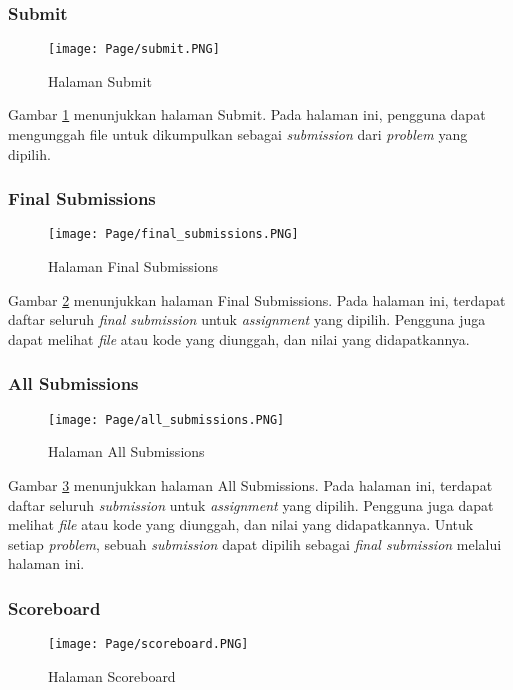 \subsubsection{Submit}
    \begin{figure}[H]
    	\centering  
    	\texttt{[image: Page/submit.PNG]}  
    	\caption{Halaman Submit}
    	\label{fig:3:submit} 
    \end{figure} 
    
    Gambar \ref{fig:3:submit} menunjukkan halaman Submit. Pada halaman ini, pengguna dapat mengunggah file untuk dikumpulkan sebagai \textit{submission} dari \textit{problem} yang dipilih.

\subsubsection{Final Submissions}
    \begin{figure}[H]
    	\centering  
    	\texttt{[image: Page/final\_submissions.PNG]}  
    	\caption{Halaman Final Submissions}
    	\label{fig:3:final_submissions} 
    \end{figure} 
    
    Gambar \ref{fig:3:final_submissions} menunjukkan halaman Final Submissions. Pada halaman ini, terdapat daftar seluruh \textit{final submission} untuk \textit{assignment} yang dipilih. Pengguna juga dapat melihat \textit{file} atau kode yang diunggah, dan nilai yang didapatkannya.
    
\subsubsection{All Submissions}
    \begin{figure}[H]
    	\centering  
    	\texttt{[image: Page/all\_submissions.PNG]}  
    	\caption{Halaman All Submissions}
    	\label{fig:3:all_submissions} 
    \end{figure} 
    
    Gambar \ref{fig:3:all_submissions} menunjukkan halaman All Submissions. Pada halaman ini, terdapat daftar seluruh \textit{submission} untuk \textit{assignment} yang dipilih. Pengguna juga dapat melihat \textit{file} atau kode yang diunggah, dan nilai yang didapatkannya. Untuk setiap \textit{problem}, sebuah \textit{submission} dapat dipilih sebagai \textit{final submission} melalui halaman ini.
    
\subsubsection{Scoreboard}
    \begin{figure}[H]
    	\centering  
    	\texttt{[image: Page/scoreboard.PNG]}  
    	\caption{Halaman Scoreboard}
    	\label{fig:3:scoreboard} 
    \end{figure} 
    
